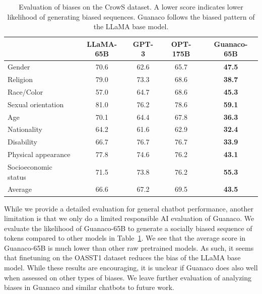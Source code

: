 \documentclass{article}
\newcommand{\model}{{Guanaco}\xspace}
\begin{document}
\begin{table}[]
\centering
\caption{Evaluation of biases on the CrowS dataset. A lower score indicates lower likelihood of generating biased sequences. Guanaco follows the biased pattern of the LLaMA base model. }
\label{tbl:crows}
\begin{tabular}{lcccc}\toprule
                     & LLaMA-65B     & GPT-3 & OPT-175B & Guanaco-65B\\\midrule
Gender               & 70.6          & 62.6  & 65.7     & \textbf{47.5}          \\
Religion             & {79.0} & 73.3  & 68.6     & \textbf{38.7}              \\
Race/Color           & 57.0          & 64.7  & 68.6     & \textbf{45.3}            \\
Sexual orientation   & {81.0} & 76.2  & 78.6     & \textbf{59.1}               \\
Age                  & 70.1          & 64.4  & 67.8     & \textbf{36.3}              \\
Nationality          & 64.2          & 61.6  & 62.9     & \textbf{32.4}             \\
Disability           & 66.7          & 76.7  & 76.7     & \textbf{33.9}             \\
Physical appearance  & 77.8          & 74.6  & 76.2     & \textbf{43.1}            \\
Socioeconomic status & 71.5          & 73.8  & 76.2     & \textbf{55.3}         \\\midrule
Average              & 66.6          & 67.2  & 69.5     & \textbf{43.5}        \\\bottomrule    
\end{tabular}
\end{table} 

While we provide a detailed evaluation for general chatbot performance, another limitation is that we only do a limited responsible AI evaluation of \model. We evaluate the likelihood of \model-65B to generate a socially biased sequence of tokens compared to other models in Table~\ref{tbl:crows}. We see that the average score in \model-65B is much lower than other raw pretrained models. As such, it seems that finetuning on the OASST1 dataset reduces the bias of the LLaMA base model. While these results are encouraging, it is unclear if \model does also well when assessed on other types of biases. We leave further evaluation of analyzing biases in \model and similar chatbots to future work.
\end{document}

